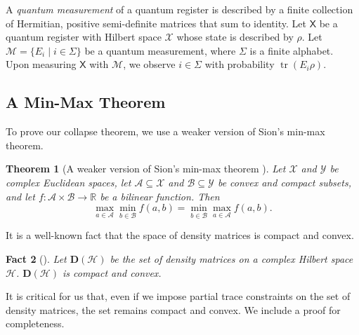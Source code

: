 \documentclass[10pt,a4paper]{article}
\newtheorem{theorem}{Theorem}[section]
\newtheorem{fact}[theorem]{Fact}
\theoremstyle{definition}
\DeclareMathOperator{\tr}{tr}
\newcommand{\reals}{\mathbb R}
\newcommand{\calA}{\mathcal{A}}
\newcommand{\calB}{\mathcal{B}}
\newcommand{\calH}{\mathcal{H}}
\newcommand{\calM}{\mathcal{M}}
\newcommand{\calX}{\mathcal{X}}
\newcommand{\calY}{\mathcal{Y}}
\newcommand{\qreg}[1]{\mathsf{#1}}
\begin{document}
A \textit{quantum measurement} of a quantum register is described by a finite collection of Hermitian, positive semi-definite matrices that sum to identity. Let $\qreg{X}$ be a quantum register with Hilbert space $\calX$ whose state is described by $\rho$. Let $\calM = \{E_i \mid i \in \Sigma\}$ be a quantum measurement, where $\Sigma$ is a finite alphabet. Upon measuring $\qreg{X}$ with $\calM$, we observe $i \in \Sigma$ with probability $\tr(E_i \rho)$. 

\subsection{A Min-Max Theorem}
To prove our collapse theorem, we use a weaker version of Sion's min-max theorem. 

\begin{theorem}[A weaker version of Sion's min-max theorem \cite{sion1958general}]\label{fact:min-max}
Let $\calX$ and $\calY$ be complex Euclidean spaces, let $\calA \subseteq \calX$ and $\calB \subseteq \calY$ be convex and compact subsets, and let $f: \calA \times \calB \to \reals$ be a bilinear function. Then 
\[
\max_{a \in \calA} \min_{b \in \calB} f(a, b) = \min_{b \in \calB} \max_{a \in \calA} f(a,b).
\]
\end{theorem}

It is a well-known fact that the space of density matrices is compact and convex.
\begin{fact}[{\cite[Chapter 1]{watrous2018theory}}]\label{fact:density-matrices-compact-convex}
Let $\mathbf{D}(\calH)$ be the set of density matrices on a complex Hilbert space $\calH$. $\mathbf{D}(\calH)$ is compact and convex.
\end{fact}

It is critical for us that, even if we impose partial trace constraints on the set of density matrices, the set remains compact and convex. We include a proof for completeness.
\end{document}
